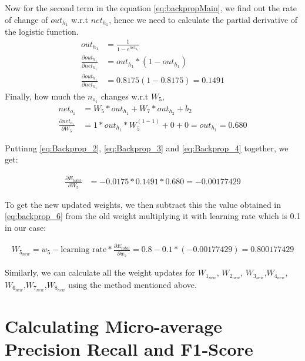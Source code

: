 Now for the second term in the equation \ref{eq:backpropMain}, we find out the rate of change of $out_{h_{1}}$ w.r.t $net_{h_{1}}$, hence we need to calculate the partial derivative of the logistic function. 
\begin{align}
    out_{h_{1}} &= \frac{1}{1-e^{net_{h_{1}}}}\\
    \frac{\partial out_{h_{1}}}{\partial net_{h_{1}}} &=  out_{h_{1}}*(1-out_{h_{1}}) \\
    \frac{\partial out_{h_{1}}}{\partial net_{h_{1}}} &= 0.8175(1-0.8175) = 0.1491 \label{eq:Backprop_3}
\end{align}
Finally, how much the $n_{o_{1}}$ changes w.r.t $W_{5}$,
\begin{align}
    net_{o_{1}} &= W_{5} * out_{h_{1}} + W_{7} * out_{h_{2}} + b_{2}   \\
    \frac{\partial net_{o_{1}}}{\partial W_{5}} &=  1 * out_{h_{1}} * W_{5}^{(1 - 1)} + 0 + 0 = out_{h_{1}} = 0.680 \label{eq:Backprop_4}
\end{align}

Puttinng \ref{eq:Backprop_2}, \ref{eq:Backprop_3} and \ref{eq:Backprop_4} together, we get:

\begin{align}
    \frac{\partial E_{total} }{\partial W_{5}} &= -0.0175 * 0.1491 * 0.680 = -0.00177429 \label{eq:backprop_6}
\end{align}

To get the new updated weights, we then subtract this the value obtained in \ref{eq:backprop_6} from the old weight multiplying it with learning rate which is 0.1 in our case:

\begin{align}
    W_{5_{new}} = w_5 - \text{learning rate}* \frac{\partial E_{total}}{\partial w_{5}} = 0.8 - 0.1 * (-0.00177429)= 0.800177429
\end{align}

Similarly, we can calculate all the weight updates for $W_{1_{new}}$, $W_{2_{new}}$, $W_{3_{new}}$,$W_{4_{new}}$,\\$W_{6_{new}}$,$W_{7_{new}}$,$W_{8_{new}}$ using the method mentioned above.

\clearpage

\section{Calculating Micro-average Precision Recall and F1-Score}\label{MicroMacroCalculation}

